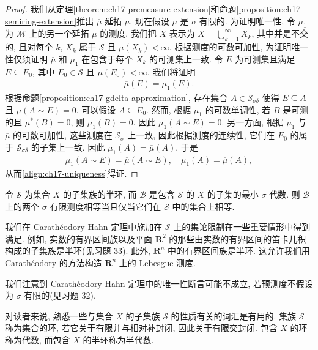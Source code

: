 \documentclass[../../main.tex]{subfiles}
\begin{document}
\begin{proof}
我们从定理\cref{theorem:ch17-premeasure-extension}和命题\cref{proposition:ch17-semiring-extension}推出 $\overline{\mu}$ 延拓 $\mu$. 现在假设 $\mu$ 是 $\sigma$ 有限的. 为证明唯一性, 令 $\mu_{1}$ 为 $\mathcal{M}$ 上的另一个延拓 $\mu$ 的测度. 我们把 $X$ 表示为 $X=\bigcup_{k=1}^{\infty}X_{k}$, 其中并是不交的, 且对每个 $k$, $X_{k}$ 属于 $\mathcal{S}$ 且 $\mu(X_{k})<\infty$. 根据测度的可数可加性, 为证明唯一性仅须证明 $\overline{\mu}$ 和 $\mu_{1}$ 在包含于每个 $X_{k}$ 的可测集上一致. 令 $E$ 为可测集且满足 $E\subseteq E_{0}$, 其中 $E_{0}\in\mathcal{S}$ 且 $\mu(E_{0})<\infty$. 我们将证明
\begin{align}
\overline{\mu}(E)=\mu_{1}(E).\label{align:ch17-uniqueness}
\end{align}
根据命题\cref{proposition:ch17-gdelta-approximation}, 存在集合 $A\in\mathcal{S}_{\sigma\delta}$ 使得 $E\subseteq A$ 且 $\overline{\mu}(A\sim E)=0$. 可以假设 $A\subseteq E_{0}$. 然而, 根据 $\mu_{1}$ 的可数单调性, 若 $B$ 是可测的且 $\mu^*(B)=0$, 则 $\mu_{1}(B)=0$. 因此 $\mu_{1}(A\sim E)=0$. 另一方面, 根据 $\mu_{1}$ 与 $\overline{\mu}$ 的可数可加性, 这些测度在 $\mathcal{S}_{\sigma}$ 上一致, 因此根据测度的连续性, 它们在 $E_{0}$ 的属于 $\mathcal{S}_{\sigma\delta}$ 的子集上一致. 因此 $\mu_{1}(A)=\overline{\mu}(A)$. 于是
\begin{align*}
\mu_{1}(A\sim E)=\overline{\mu}(A\sim E),\quad\mu_{1}(A)=\overline{\mu}(A),
\end{align*}
从而\eqref{align:ch17-uniqueness}得证.
\end{proof}

\begin{corollary}\label{corollary:ch17-uniqueness-semiring}
令 $\mathcal{S}$ 为集合 $X$ 的子集族的半环, 而 $\mathcal{B}$ 是包含 $\mathcal{S}$ 的 $X$ 的子集的最小 $\sigma$ 代数. 则 $\mathcal{B}$ 上的两个 $\sigma$ 有限测度相等当且仅当它们在 $\mathcal{S}$ 中的集合上相等.
\end{corollary}

我们在 Carath\'eodory-Hahn 定理中施加在 $\mathcal{S}$ 上的集论限制在一些重要情形中得到满足. 例如, 实数的有界区间族以及平面 $\mathbf{R}^{2}$ 的那些由实数的有界区间的笛卡儿积构成的子集族是半环(见习题 33). 此外, $\mathbf{R}^{n}$ 中的有界区间族是半环. 这允许我们用 Carath\'eodory 的方法构造 $\mathbf{R}^{n}$ 上的 Lebesgue 测度.

我们注意到 Carath\'eodory-Hahn 定理中的唯一性断言可能不成立, 若预测度不假设为 $\sigma$ 有限的(见习题 32).

对读者来说, 熟悉一些与集合 $X$ 的子集族 $\mathcal{S}$ 的性质有关的词汇是有用的. 集族 $\mathcal{S}$ 称为集合的环, 若它关于有限并与相对补封闭, 因此关于有限交封闭. 包含 $X$ 的环称为代数, 而包含 $X$ 的半环称为半代数.
\end{document}
